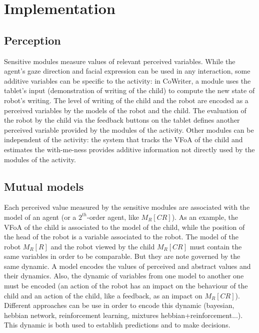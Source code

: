 \documentclass[10pt,a4paper]{article}
\begin{document}
\section{Implementation}\label{arch} 

\subsection{Perception}
\label{ssec:perception}
Sensitive modules measure values of relevant perceived variables. 
While the agent's gaze direction and facial expression can be used in any interaction, some additive variables can be specific to the activity: in CoWriter, a module uses the tablet's input (demonstration of writing of the child) to compute the new state of robot's writing. The level of writing of the child and the robot are encoded as a perceived variables by the models of the robot and the child.
The evaluation of the robot by the child via the feedback buttons on the tablet defines another perceived variable provided by the modules of the activity. 
Other modules can be independent of the activity: the system that tracks the VFoA of the child and estimates the with-me-ness provides additive information not directly used by the modules of the activity.  

\subsection{Mutual models}
\label{ssec:mmm}
Each perceived value measured by the sensitive modules are associated with the model of an agent (or a $2^{th}$-order agent, like $M_R\left[CR\right]$). As an example, the VFoA of the child is associated to the model of the child, while the position of the head of the robot is a variable associated to the robot.
The model of the robot $M_R\left[R\right]$ and the robot viewed by the child $M_R\left[CR\right]$ must contain the same variables in order to be comparable. But they are note governed by the same dynamic.
A model encodes the values of perceived and abstract values and their dynamics. Also, the dynamic of variables from one model to another one must be encoded (an action of the robot has an impact on the behaviour of the child and an action of the child, like a feedback, as an impact on $M_R\left[CR\right]$). Different approaches can be use in order to encode this dynamic (bayesian, hebbian network, reinforcement learning, mixtures hebbian+reinforcement...). This dynamic is both used to establish predictions and to make decisions.
\end{document}
